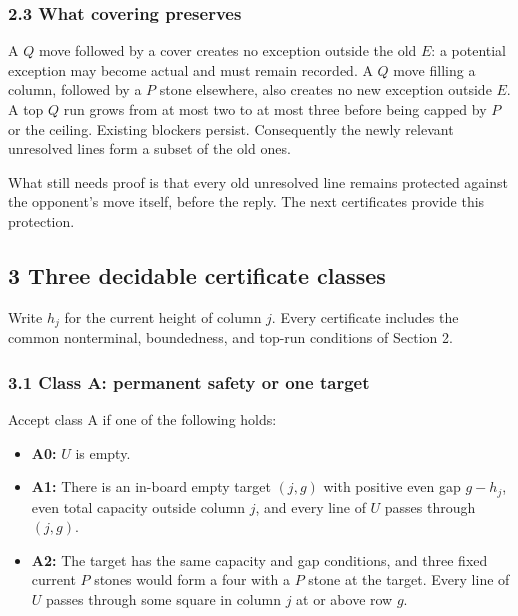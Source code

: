 \documentclass[
  a4paper,
]{article}
\providecommand{\tightlist}{%
  \setlength{\itemsep}{0pt}\setlength{\parskip}{0pt}}
\begin{document}
\subsubsection{2.3 What covering
preserves}\label{what-covering-preserves}

A \(Q\) move followed by a cover creates no exception outside the old
\(E\): a potential exception may become actual and must remain recorded.
A \(Q\) move filling a column, followed by a \(P\) stone elsewhere, also
creates no new exception outside \(E\). A top \(Q\) run grows from at
most two to at most three before being capped by \(P\) or the ceiling.
Existing blockers persist. Consequently the newly relevant unresolved
lines form a subset of the old ones.

What still needs proof is that every old unresolved line remains
protected against the opponent's move itself, before the reply. The next
certificates provide this protection.

\subsection{3 Three decidable certificate
classes}\label{three-decidable-certificate-classes}

Write \(h_j\) for the current height of column \(j\). Every certificate
includes the common nonterminal, boundedness, and top-run conditions of
Section 2.

\subsubsection{3.1 Class A: permanent safety or one
target}\label{class-a-permanent-safety-or-one-target}

Accept class A if one of the following holds:

\begin{itemize}
\tightlist
\item
  \textbf{A0:} \(U\) is empty.
\item
  \textbf{A1:} There is an in-board empty target \((j,g)\) with positive
  even gap \(g-h_j\), even total capacity outside column \(j\), and
  every line of \(U\) passes through \((j,g)\).
\item
  \textbf{A2:} The target has the same capacity and gap conditions, and
  three fixed current \(P\) stones would form a four with a \(P\) stone
  at the target. Every line of \(U\) passes through some square in
  column \(j\) at or above row \(g\).
\end{itemize}
\end{document}
